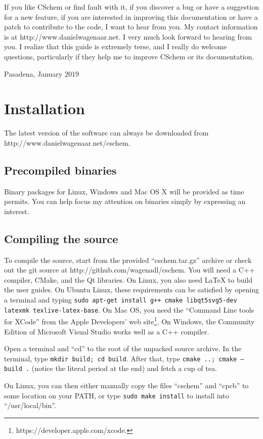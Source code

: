\documentclass[11pt]{report}
\def\terminal#1{{\tt#1}}
\begin{document}
If you like CSchem or find fault with it, if you discover a bug or
have a suggestion for a new feature, if you are interested in
improving this documentation or have a patch to contribute to the
code, I want to hear from you. My contact information is at
http://www.danielwagenaar.net. I very much look forward to hearing
from you. I realize that this guide is extremely terse, and I really
do welcome questions, particularly if they help me to improve CSchem
or its documentation.\bigskip

\noindent Pasadena, January 2019

\chapter{Installation}

The latest version of the software can always be downloaded from\break
http://www.danielwagenaar.net/cschem.

\section{Precompiled binaries}

Binary packages for Linux, Windows and Mac OS X will be provided as
time permits. You can help focus my attention on binaries simply by
expressing an interest.

\section{Compiling the source}
To compile the source, start from the provided ``cschem.tar.gz''
archive or check out the git source at
http://github.com/wagenadl/cschem.  You will need a C++ compiler,
CMake, and the Qt libraries. On Linux, you also need LaTeX to build
the user guides. On Ubuntu Linux, these requirements can be satisfied
by opening a terminal and typing \terminal{sudo apt-get install g++
  cmake libqt5svg5-dev latexmk texlive-latex-base}. On Mac OS, you
need the ``Command Line tools for XCode'' from the Apple Developers'
web site\footnote{https://developer.apple.com/xcode.}. On Windows, the
Community Edition of Microsoft Visual Studio works well as a C++
compiler.

Open a terminal and ``cd'' to the root of the unpacked source archive.
In the terminal, type \terminal{mkdir build; cd build}. After that,
type \terminal{cmake ..; cmake --build .} (notice the literal period
at the end) and fetch a cup of tea.

On Linux, you can then either manually copy the files ``cschem'' and
``cpcb'' to some location on your PATH, or type \terminal{sudo make
  install} to install into ``/usr/local/bin''.
\end{document}
